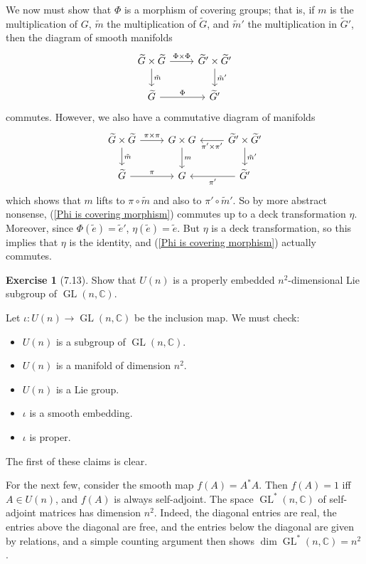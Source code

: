 \documentclass[10pt]{article}
\newcommand{\CC}{\mathbb{C}}
\newcommand{\GL}{\operatorname{GL}}
\theoremstyle{definition}
\newtheorem{exer}{Exercise}
\begin{document}
We now must show that $\Phi$ is a morphism of covering groups; that is, if $m$ is the multiplication of $G$, $\tilde m$ the multiplication of $\widetilde G$, and $\tilde m'$ the multiplication in $\widetilde G'$, then the diagram of smooth manifolds
\begin{equation}
\label{Phi is covering morphism}
\begin{tikzcd}
\widetilde G \times \widetilde G \arrow[r,"\Phi \times \Phi"] \arrow[d,"\tilde m"] & \widetilde G' \times \widetilde G' \arrow[d,"\tilde m'"]\\
\widetilde G \arrow[r,"\Phi"] & \widetilde G'
\end{tikzcd}
\end{equation}
commutes. However, we also have a commutative diagram of manifolds
$$\begin{tikzcd}
\widetilde G \times \widetilde G \arrow[r,"\pi \times \pi"] \arrow[d,"\tilde m"] & G \times G \arrow[d,"m"] & \widetilde G' \times \widetilde G' \arrow[l,"\pi' \times \pi'"] \arrow[d,"\tilde m'"]\\
\widetilde G \arrow[r,"\pi"] & G & \widetilde G' \arrow[l,"\pi'"]
\end{tikzcd}$$
which shows that $m$ lifts to $\pi \circ \tilde m$ and also to $\pi' \circ \tilde m'$.
So by more abstract nonsense, (\ref{Phi is covering morphism}) commutes up to a deck transformation $\eta$.
Moreover, since $\Phi(\tilde e) = \tilde e'$, $\eta(\tilde e) = \tilde e$.
But $\eta$ is a deck transformation, so this implies that $\eta$ is the identity, and (\ref{Phi is covering morphism}) actually commutes.

\begin{exer}[7.13]
Show that $U(n)$ is a properly embedded $n^2$-dimensional Lie subgroup of $\GL(n, \CC)$.
\end{exer}

Let $\iota: U(n) \to \GL(n, \CC)$ be the inclusion map.
We must check:
\begin{itemize}
\item $U(n)$ is a subgroup of $\GL(n, \CC)$.
\item $U(n)$ is a manifold of dimension $n^2$.
\item $U(n)$ is a Lie group.
\item $\iota$ is a smooth embedding.
\item $\iota$ is proper.
\end{itemize}
The first of these claims is clear.

For the next few, consider the smooth map $f(A) = A^*A$. Then $f(A) = 1$ iff $A \in U(n)$, and $f(A)$ is always self-adjoint.
The space $\GL^*(n, \CC)$ of self-adjoint matrices has dimension $n^2$.
Indeed, the diagonal entries are real, the entries above the diagonal are free, and the entries below the diagonal are given by relations, and a simple counting argument then shows $\dim \GL^*(n, \CC) = n^2$.
\end{document}
